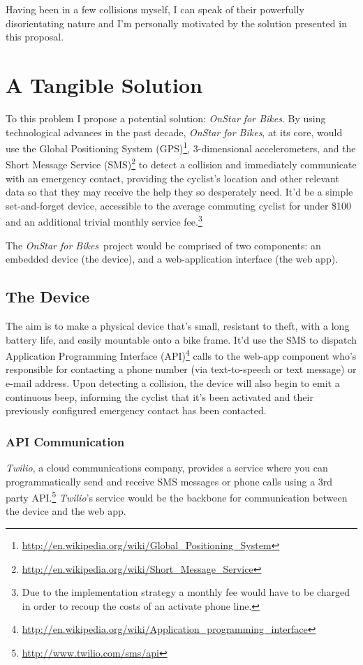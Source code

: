 \documentclass[titlepage]{article}
\newcommand{\onstar}{{\em OnStar for Bikes}}
\begin{document}
Having been in a few collisions myself, I can speak of their powerfully disorientating nature and I'm personally motivated by the solution presented in this proposal.

\section{A Tangible Solution}
To this problem I propose a potential solution: \onstar. By using technological advances in the past decade, \onstar, at its core, would use the Global Positioning System (GPS)\footnote{\url{http://en.wikipedia.org/wiki/Global_Positioning_System}}, 3-dimensional accelerometers, and the Short Message Service (SMS)\footnote{\url{http://en.wikipedia.org/wiki/Short_Message_Service}} to detect a collision and immediately communicate with an emergency contact, providing the cyclist's location and other relevant data so that they may receive the help they so desperately need. It'd be a simple set-and-forget device, accessible to the average commuting cyclist for under \$100 and an additional trivial monthly service fee.\footnote{Due to the implementation strategy a monthly fee would have to be charged in order to recoup the costs of an activate phone line.}

The \onstar\ project would be comprised of two components: an embedded device (the device), and a web-application interface (the web app).

\subsection{The Device}
The aim is to make a physical device that's small, resistant to theft, with a long battery life, and easily mountable onto a bike frame. It'd use the SMS to dispatch Application Programming Interface (API)\footnote{\url{http://en.wikipedia.org/wiki/Application_programming_interface}} calls to the web-app component who's responsible for contacting a phone number (via text-to-speech or text message) or e-mail address. Upon detecting a collision, the device will also begin to emit a continuous beep, informing the cyclist that it's been activated and their previously configured emergency contact has been contacted.

\subsubsection{API Communication}
{\em Twilio}, a cloud communications company, provides a service where you can programmatically send and receive SMS messages or phone calls using a 3rd party API.\footnote{\url{http://www.twilio.com/sms/api}} {\em Twilio}'s service would be the backbone for communication between the device and the web app.
\end{document}
